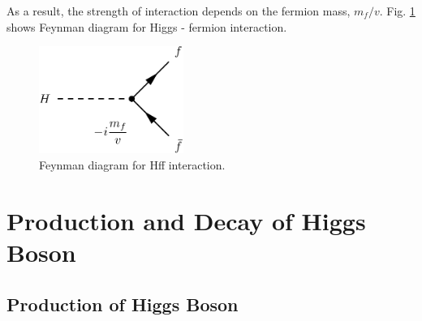 As a result, the strength of interaction depends on the fermion mass, $m_f / v$. 
Fig. \ref{fig:fd_HFFterm} shows Feynman diagram for Higgs - fermion interaction.    
\begin{figure}[htp]
\centering
\includegraphics[height=3.5cm]{figures/FD_HFFterm.pdf}
\caption{ Feynman diagram for Hff interaction.}
\label{fig:fd_HFFterm}
\end{figure}





\newpage
\section{Production and Decay of Higgs Boson}


\subsection{Production of Higgs Boson}

